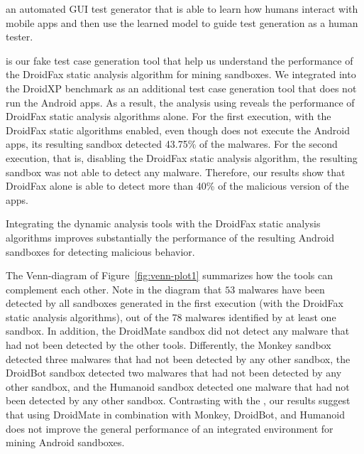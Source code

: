 \begin{description}
    
    an automated GUI test
generator that is able to learn how humans interact with
mobile apps and then use the learned model to guide test
generation as a human tester.
    
    
    

  \item[\joke] is our fake test case generation tool that help us understand the performance of the DroidFax static analysis algorithm for mining sandboxes. 
    We integrated \joke into the DroidXP benchmark as an additional test case generation tool that does not run the Android apps.
    As a result, the analysis using \joke reveals the performance of DroidFax static analysis algorithms alone. For the first execution, with the DroidFax static
    algorithms enabled, even though \joke does not execute the Android apps, its resulting sandbox detected 43.75\% of the malwares. For the second execution,
    that is, disabling the DroidFax static analysis algorithm, the resulting \joke sandbox was not able to detect any malware. Therefore,
    our results show that DroidFax alone is able to detect more than 40\% of the malicious version of the apps. 

\end{description}


\begin{finding}
  Integrating the dynamic analysis tools
  with the DroidFax static analysis algorithms
  improves substantially the performance
  of the resulting Android sandboxes for
  detecting malicious behavior. 
\end{finding}
 
The Venn-diagram of Figure~\ref{fig:venn-plot1}
summarizes how the tools can complement each other.
Note in the diagram that $53$ malwares have been detected
by all sandboxes generated in the first execution (with the DroidFax static analysis algorithms),
out of the 78 malwares identified by at least one sandbox. In addition, the DroidMate sandbox did not detect
any malware that had not been detected by the other tools. Differently, the Monkey sandbox detected
three malwares that had not been detected by any other sandbox, the DroidBot sandbox detected two malwares
that had not been detected by any other sandbox, and the Humanoid sandbox detected one malware that had not
been detected by any other sandbox. 
Contrasting with the \blls,
our results suggest that using DroidMate in combination with Monkey, DroidBot, and Humanoid
does not improve the general performance of an integrated environment for mining
Android sandboxes.

